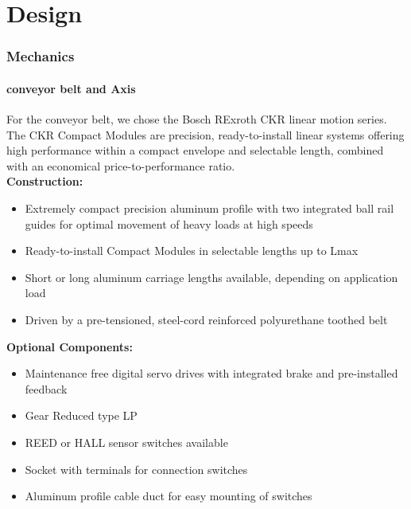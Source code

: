 \documentclass[11pt,a4paper]{article}
\begin{document}
\newpage
\part{Design}

\section{Mechanics}

\subsection{conveyor belt and Axis}

For the conveyor belt, we chose the Bosch RExroth CKR linear motion series. The CKR Compact Modules are precision, ready-to-install linear systems offering high performance within a compact envelope and selectable length, combined with an economical price-to-performance ratio.\\


\textbf{Construction:}
\begin{itemize}
	\item Extremely compact precision aluminum profile with two integrated ball rail guides for optimal movement of heavy loads at high speeds
	\item Ready-to-install Compact Modules in selectable lengths up to Lmax
	\item Short or long aluminum carriage lengths available, depending on application load
	\item Driven by a pre-tensioned, steel-cord reinforced polyurethane toothed belt\\
\end{itemize}

\textbf{Optional Components:}
\begin{itemize}
	\item Maintenance free digital servo drives with integrated brake and pre-installed feedback
	\item Gear Reduced type LP
	\item REED or HALL sensor switches available
	\item Socket with terminals for connection switches
	\item Aluminum profile cable duct for easy mounting of switches\\
\end{itemize}
\end{document}
